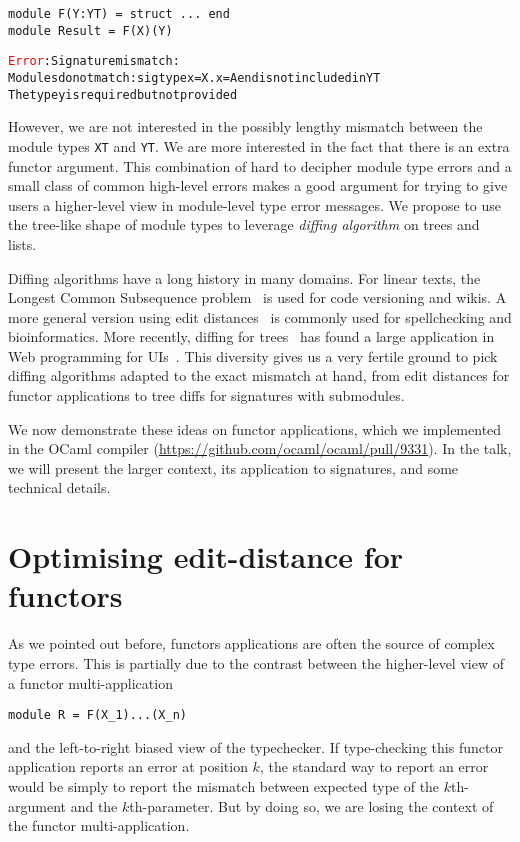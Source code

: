 \documentclass[a4paper,11pt]{scrartcl}
\newcommand{\error}[1]{\textcolor{red}{#1}}
\begin{document}
\begin{verbatim}
module F(Y:YT) = struct ... end
module Result = F(X)(Y)
\end{verbatim}
\begin{alltt}
\error{Error}: Signature mismatch:
       Modules do not match: sig type x = X.x = A end is not included in YT
       The type y is required but not provided
\end{alltt}

However, we are not interested in the possibly lengthy mismatch between the module types \texttt{XT} and
\texttt{YT}. We are more interested in the fact that there is an extra functor argument.
%
This combination of hard to decipher module type errors and a small class of common high-level errors makes
a good argument for trying to give users a higher-level view in module-level type error messages.
We propose to use the tree-like shape of module types to leverage
\emph{diffing algorithm} on trees and lists.

Diffing algorithms have a long history in many domains. For linear texts, the
Longest Common Subsequence problem~\cite{DBLP:conf/spire/BergrothHR00} is used for code versioning and wikis. A more general version
using edit distances~\cite{DBLP:journals/csur/Navarro01} is commonly used for spellchecking and bioinformatics.
More recently, diffing for trees~\cite{DBLP:journals/tcs/Bille05}
has found a large application
in Web programming for UIs~\cite{reactjs}. This diversity gives
us a very fertile ground to pick diffing algorithms adapted to the exact
mismatch at hand, from edit distances for functor applications to
tree diffs for signatures with submodules.

We now demonstrate these ideas on functor applications, which
we implemented in the OCaml compiler
(\url{https://github.com/ocaml/ocaml/pull/9331}).
In the talk, we will present the larger context, its application to signatures,
and some technical details.

\section{Optimising edit-distance for functors}

As we pointed out before, functors applications are often the source
of complex type errors. This is partially due to the contrast between the higher-level view of a functor multi-application

\begin{verbatim}
module R = F(X_1)...(X_n)
\end{verbatim}
%
and the left-to-right biased view of the typechecker.
If type-checking this functor application reports an error at position $k$, the standard
way to report an error would be simply to report the mismatch between expected type of
the $k$th-argument and the $k$th-parameter. But by doing so, we are losing the context of the
functor multi-application.
\end{document}
